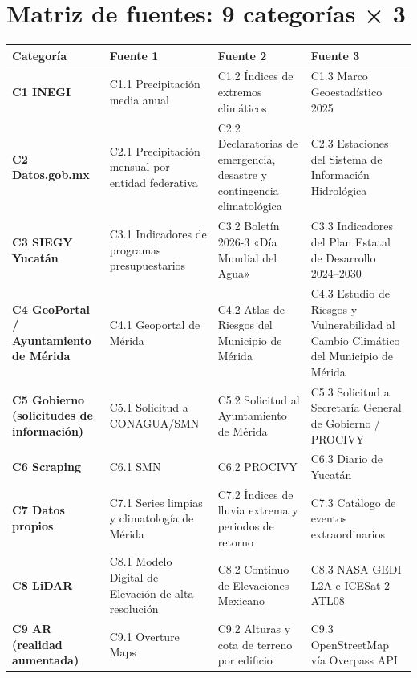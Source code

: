 \documentclass[11pt,a4paper]{article}
\begin{document}
\section{Matriz de fuentes: 9 categorías × 3}

{\small
\begin{longtable}{@{}>{\raggedright\arraybackslash}p{2.9cm}>{\raggedright\arraybackslash}p{4.4cm}>{\raggedright\arraybackslash}p{4.4cm}>{\raggedright\arraybackslash}p{4.4cm}@{}}
\toprule
\textbf{Categoría} & \textbf{Fuente 1} & \textbf{Fuente 2} & \textbf{Fuente 3} \\ \midrule
\endhead
\textbf{C1 INEGI} & C1.1 Precipitación media anual & C1.2 Índices de extremos climáticos & C1.3 Marco Geoestadístico 2025 \\ \midrule
\textbf{C2 Datos.gob.mx} & C2.1 Precipitación mensual por entidad federativa & C2.2 Declaratorias de emergencia, desastre y contingencia climatológica & C2.3 Estaciones del Sistema de Información Hidrológica \\ \midrule
\textbf{C3 SIEGY Yucatán} & C3.1 Indicadores de programas presupuestarios & C3.2 Boletín 2026-3 «Día Mundial del Agua» & C3.3 Indicadores del Plan Estatal de Desarrollo 2024–2030 \\ \midrule
\textbf{C4 GeoPortal / Ayuntamiento de Mérida} & C4.1 Geoportal de Mérida & C4.2 Atlas de Riesgos del Municipio de Mérida & C4.3 Estudio de Riesgos y Vulnerabilidad al Cambio Climático del Municipio de Mérida \\ \midrule
\textbf{C5 Gobierno (solicitudes de información)} & C5.1 Solicitud a CONAGUA/SMN & C5.2 Solicitud al Ayuntamiento de Mérida & C5.3 Solicitud a Secretaría General de Gobierno / PROCIVY \\ \midrule
\textbf{C6 Scraping} & C6.1 SMN & C6.2 PROCIVY & C6.3 Diario de Yucatán \\ \midrule
\textbf{C7 Datos propios} & C7.1 Series limpias y climatología de Mérida & C7.2 Índices de lluvia extrema y periodos de retorno & C7.3 Catálogo de eventos extraordinarios \\ \midrule
\textbf{C8 LiDAR} & C8.1 Modelo Digital de Elevación de alta resolución & C8.2 Continuo de Elevaciones Mexicano & C8.3 NASA GEDI L2A e ICESat-2 ATL08 \\ \midrule
\textbf{C9 AR (realidad aumentada)} & C9.1 Overture Maps & C9.2 Alturas y cota de terreno por edificio & C9.3 OpenStreetMap vía Overpass API \\ \midrule
\end{longtable}}
\end{document}
